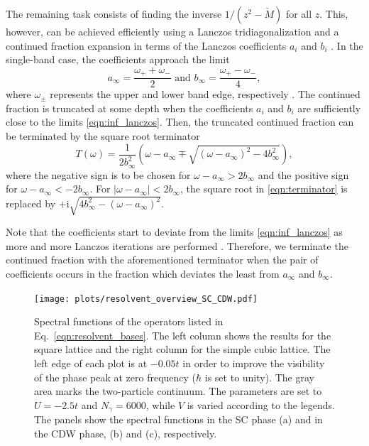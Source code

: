 \documentclass[
    reprint, 
    aps,
    preprintnumbers,
    twocolumn,
    prb,
    superscriptaddress
]{revtex4-2}
\newcommand{\im}{\mathrm{i}}
\begin{document}
The remaining task consists of finding the inverse $1/(z^2 - \check{M})$ for all $z$.
This, however, can be achieved efficiently using a Lanczos tridiagonalization and
a continued fraction expansion in terms of the Lanczos coefficients $a_i$ and $b_i$ 
\cite{PettiforRecursion,ViswanathRecursion}.
In the single-band case, the coefficients approach the limit
\begin{equation}
    \label{eqn:inf_lanczos}
    a_\infty = \frac{\omega_+ + \omega_-}{2}\text{  and  } b_\infty = \frac{\omega_+ - \omega_-}{4},
\end{equation}
where $\omega_\pm$ represents the upper and lower band edge, respectively \cite{PettiforRecursion}.
The continued fraction is truncated at some depth when the coefficients $a_i$ and $b_i$ are sufficiently
close to the limits \eqref{eqn:inf_lanczos}. Then, the truncated continued fraction can be terminated by the
square root terminator
\begin{equation}
\label{eqn:terminator}
    T(\omega) = \frac{1}{2b_\infty^2} 
		\left( \omega - a_\infty \mp \sqrt{(\omega - a_\infty)^2 - 4 b_\infty^2} \right),
\end{equation}
where the negative sign is to be chosen for $\omega - a_\infty > 2b_\infty$ and the positive sign for
$\omega - a_\infty < -2b_\infty$. For $|\omega - a_\infty| < 2b_\infty$, the square root in \eqref{eqn:terminator}
is replaced by $+\im\sqrt{4 b_\infty^2 - (\omega - a_\infty)^2}$.

Note that the coefficients start to deviate from the limits \eqref{eqn:inf_lanczos} as more and more Lanczos iterations are performed \cite{ViswanathRecursion}.
Therefore, we terminate the continued fraction with the aforementioned terminator when the pair of coefficients 
occurs in the fraction which deviates the least from $a_\infty$ and $b_\infty$.



\begin{figure}
    \centering
    \texttt{[image: plots/resolvent\_overview\_SC\_CDW.pdf]}
    \caption{Spectral functions of the operators listed in Eq.~\eqref{eqn:resolvent_bases}.
    The left column shows the results for the square lattice and the right column for the simple cubic lattice.
    The left edge of each plot is at $-0.05t$  in order to improve the visibility of the phase peak at zero frequency
		($\hbar$ is set to unity). The gray area marks the two-particle continuum.
    The parameters are set to $U=-2.5t$ and $N_\gamma = 6000$, while $V$ is varied according to the legends.
    The panels show the spectral functions in the SC phase (a) and in the CDW phase, (b) and (c), respectively.}
    \label{fig:resolvent_overview_SC}
\end{figure}
\end{document}

